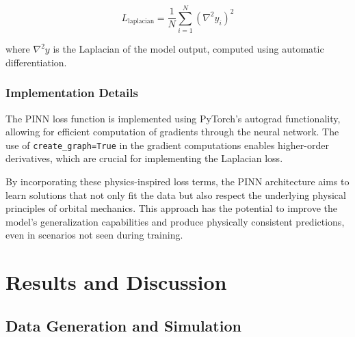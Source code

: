 \documentclass[12pt,a4paper]{article}
\begin{document}
\[ L_{\text{laplacian}} = \frac{1}{N} \sum_{i=1}^N \left(\nabla^2 y_i\right)^2 \]

where $\nabla^2 y$ is the Laplacian of the model output, computed using automatic differentiation.

\subsubsection{Implementation Details}
The PINN loss function is implemented using PyTorch's autograd functionality, allowing for efficient computation of gradients through the neural network. The use of \texttt{create\_graph=True} in the gradient computations enables higher-order derivatives, which are crucial for implementing the Laplacian loss.

By incorporating these physics-inspired loss terms, the PINN architecture aims to learn solutions that not only fit the data but also respect the underlying physical principles of orbital mechanics. This approach has the potential to improve the model's generalization capabilities and produce physically consistent predictions, even in scenarios not seen during training.
\section{Results and Discussion}
\label{sec:results}

\subsection{Data Generation and Simulation}
\end{document}
